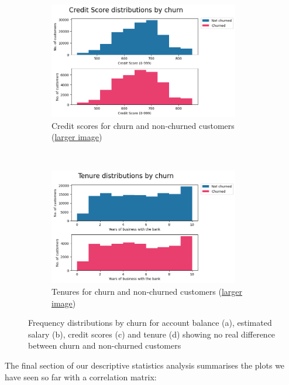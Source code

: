 \documentclass[]{article}
\begin{document}
\begin{figure}[t!]
	\begin{subfigure}[t]{0.55\textwidth}
		\centering
		\includegraphics[height=2in]{credit_score_by_churn}
		\caption{Credit scores for churn and non-churned customers (\href{https://github.com/ray33ee/Understanding-predicting-and-preventing-churn/blob/main/tex/credit_score_by_churn.png?raw=true}{larger image})}
	\end{subfigure}%
	~
	\begin{subfigure}[t]{0.5\textwidth}
		\centering
		\includegraphics[height=2in]{tenure_by_churn}
		\caption{Tenures for churn and non-churned customers (\href{https://github.com/ray33ee/Understanding-predicting-and-preventing-churn/blob/main/tex/tenure_by_churn.png?raw=true}{larger image})}
	\end{subfigure}
	\caption{Frequency distributions by churn for account balance (a), estimated salary (b), credit scores (c) and tenure (d) showing no real difference between churn and non-churned customers}
\end{figure}

The final section of our descriptive statistics analysis summarises the plots we have seen so far with a correlation matrix:
\end{document}
